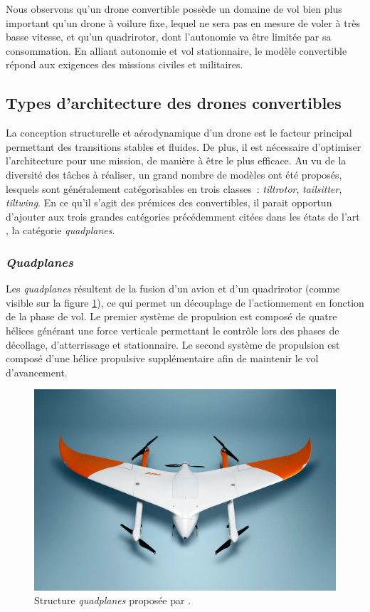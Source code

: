    Nous observons qu'un drone convertible possède un domaine de vol bien plus important qu'un drone à voilure fixe, lequel ne sera pas en mesure de voler à très basse vitesse, et qu'un quadrirotor, dont l'autonomie va être limitée par sa consommation.
    En alliant autonomie et vol stationnaire, le modèle convertible répond aux exigences des missions civiles et militaires.

    \subsection{Types d'architecture des drones convertibles}
    \label{sec:archConvertible}
    La conception structurelle et aérodynamique d'un drone est le facteur principal permettant des transitions stables et fluides. De plus, il est nécessaire d'optimiser l'architecture pour une mission, de manière à être le plus efficace. Au vu de la diversité des tâches à réaliser, un grand nombre de modèles ont été proposés, lesquels sont généralement catégorisables en trois classes : \textit{tiltrotor}, \textit{tailsitter}, \textit{tiltwing}. 
    En ce qu'il s'agit des prémices des convertibles, il parait opportun d'ajouter aux trois grandes catégories précédemment citées dans les états de l'art \cite{saeed_survey_2018,ducard_review_2021, review_2022}, la catégorie \textit{quadplanes}.

        \subsubsection*{\textit{Quadplanes}}
        Les \textit{quadplanes} résultent de la fusion d'un avion et d'un quadrirotor (comme visible sur la figure \ref{fig:quadplane}), ce qui permet un découplage de l'actionnement en fonction de la phase de vol. Le premier système de propulsion est composé de quatre hélices générant une force verticale permettant le contrôle lors des phases de décollage, d'atterrissage et stationnaire. Le second système de propulsion est composé d'une hélice propulsive supplémentaire afin de maintenir le vol d'avancement.

        \begin{figure}[ht!]
            \centering
                \includegraphics[width=0.6\columnwidth]{figures/Avy-Drone-quadplane.jpg}
                \caption{Structure \textit{quadplanes} proposée par \cite{Avy_2023}.}
                \label{fig:quadplane}
        \end{figure}
        

